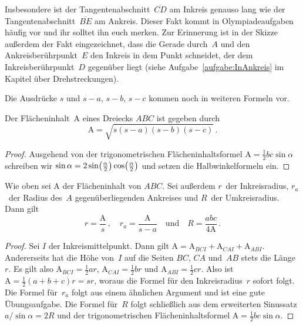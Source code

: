 \begin{aufgabe*}
	Insbesondere ist der Tangentenabschnitt~$\overline{CD}$ am Inkreis genauso lang wie der Tangentenabschnitt~$\overline{BE}$ am Ankreis. Dieser Fakt kommt in Olympiadeaufgaben häufig vor und ihr solltet ihn euch merken. Zur Erinnerung ist in der Skizze außerdem der Fakt eingezeichnet, dass die Gerade durch~$A$ und den Ankreisberührpunkt~$E$ den Inkreis in dem Punkt schneidet, der dem Inkreisberührpunkt~$D$ gegenüber liegt (siehe Aufgabe~\ref{aufgabe:InAnkreis} im Kapitel über Drehstreckungen).
\end{aufgabe*}

Die Ausdrücke $s$ und $s-a$, $s-b$, $s-c$ kommen noch in weiteren Formeln vor.

\begin{satzmitnamen}
	Der Flächeninhalt~$\mathrm{A}$ eines Dreiecks $ABC$ ist gegeben durch
	\begin{equation*}
		\mathrm{A}=\sqrt{s(s-a)(s-b)(s-c)}\,.
	\end{equation*}
\end{satzmitnamen}

\begin{proof}
	Ausgehend von der trigonometrischen Flächeninhaltsformel $\mathrm{A}=\frac 12bc\sin\alpha$ schreiben wir $\sin\alpha=2\sin\parens*{\frac\alpha2}\cos\parens*{\frac\alpha2}$ und setzen die Halbwinkelformeln ein.
\end{proof}

\begin{satzmitnamen}
	Wie oben sei $\mathrm{A}$ der Flächeninhalt von $ABC$. Sei außerdem $r$~der Inkreisradius, $r_a$~der Radius des~$A$ gegenüberliegenden Ankreises und $R$~der Umkreisradius. Dann gilt
	\begin{equation*}
		r=\frac{\mathrm{A}}{s}\,,\quad r_a=\frac{\mathrm{A}}{s-a}\quad\text{und}\quad R=\frac{abc}{4\mathrm{A}}\,.
	\end{equation*}
\end{satzmitnamen}

\begin{proof}
	Sei $I$ der Inkreismittelpunkt. Dann gilt $\mathrm{A}=\mathrm{A}_{BCI}+\mathrm{A}_{CAI}+\mathrm{A}_{ABI}$. Andererseits hat die Höhe von~$I$ auf die Seiten $BC$, $CA$ und~$AB$ stets die Länge~$r$. Es gilt also $\mathrm{A}_{BCI}=\frac12 ar$, $\mathrm{A}_{CAI}=\frac12 br$ und $\mathrm{A}_{ABI}=\frac12 cr$. Also ist $\mathrm{A}=\frac 12(a+b+c)r=sr$, woraus die Formel für den Inkreisradius~$r$ sofort folgt. Die Formel für~$r_a$ folgt aus einem ähnlichen Argument und ist eine gute Übungsaufgabe. Die Formel für~$R$ folgt schließlich aus dem erweiterten Sinussatz $a/\!\sin\alpha=2R$ und der trigonometrischen Flächeninhaltsformel $\mathrm{A}=\frac 12bc\sin\alpha$.
\end{proof}

